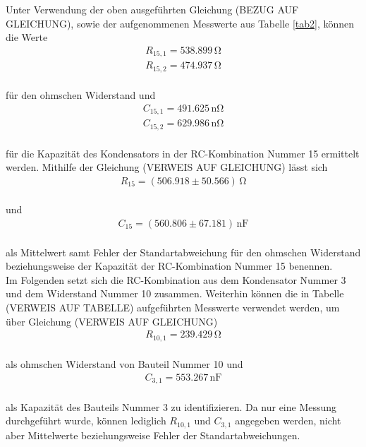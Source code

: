 Unter Verwendung der oben ausgeführten Gleichung (BEZUG AUF GLEICHUNG), sowie der aufgenommenen
Messwerte aus Tabelle \ref{tab2}, können die Werte 
\begin{align}
R_{15,1} = 538.899\,\si{\ohm} \nonumber \\
R_{15,2} = 474.937\,\si{\ohm} \nonumber  
\end{align}
\\
für den ohmschen Widerstand und
\begin{align}
C_{15,1} = 491.625\,\si{\nano\ohm} \nonumber \\
C_{15,2} = 629.986\,\si{\nano\ohm} \nonumber 
\end{align}
\\
für die Kapazität des Kondensators in der RC-Kombination Nummer 15 ermittelt werden.
Mithilfe der Gleichung (VERWEIS AUF GLEICHUNG)
lässt sich 
\begin{align}
R_{15} = (506.918 \pm 50.566)\, \si{\ohm} \nonumber 
\end{align}
\\
und
\begin{align}
C_{15} = (560.806 \pm 67.181)\, \si{\nano\farad} \nonumber 
\end{align}
\\
als Mittelwert samt Fehler der Standartabweichung für den ohmschen Widerstand beziehungsweise der
Kapazität der RC-Kombination Nummer 15 benennen.
\\
Im Folgenden setzt sich die RC-Kombination aus dem Kondensator Nummer 3 und dem Widerstand Nummer 10 zusammen. Weiterhin 
können die in Tabelle (VERWEIS AUF TABELLE) aufgeführten Messwerte verwendet werden, um über Gleichung
(VERWEIS AUF GLEICHUNG) 
\begin{align}
R_{10,1} = 239.429\, \si{\ohm} \nonumber
\end{align}
\\
als ohmschen Widerstand von Bauteil Nummer 10 und
\begin{align}
C_{3,1} = 553.267\, \si{\nano\farad} \nonumber
\end{align}
\\
als Kapazität des Bauteils Nummer 3 zu identifizieren. Da nur eine Messung durchgeführt wurde, können lediglich $R_{10,1}$
und $C_{3,1}$ angegeben werden, nicht aber Mittelwerte beziehungsweise Fehler der Standartabweichungen.


